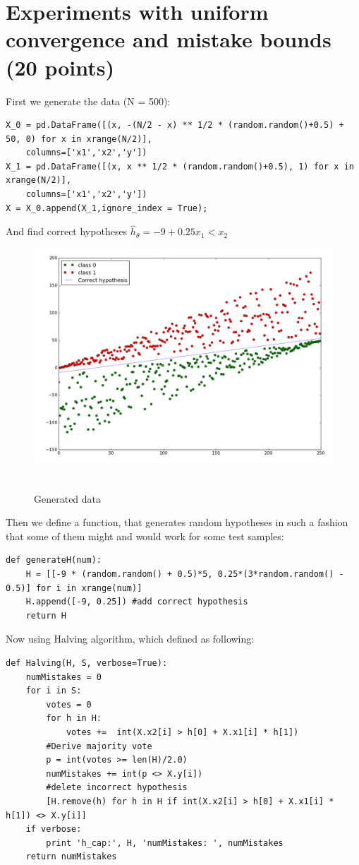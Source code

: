 \documentclass{article}
\newcommand{\hhat}{\hat{h}}
\begin{document}
\pagebreak
\section{Experiments with uniform convergence and mistake bounds (20 points)}	
First we generate the data (N = 500):
\begin{lstlisting}[frame=single]  
X_0 = pd.DataFrame([(x, -(N/2 - x) ** 1/2 * (random.random()+0.5) + 50, 0) for x in xrange(N/2)],
	columns=['x1','x2','y'])
X_1 = pd.DataFrame([(x, x ** 1/2 * (random.random()+0.5), 1) for x in xrange(N/2)],
	columns=['x1','x2','y'])
X = X_0.append(X_1,ignore_index = True);
\end{lstlisting}
And find correct hypotheses $\hhat_{\theta} = -9 + 0.25x_1 < x_2$
\begin{figure}[!htb]
	\centering
	\includegraphics[width=6in,clip,keepaspectratio]{data.png}\
	\caption{Generated data}	
\end{figure}

Then we define a function, that generates random hypotheses in such a fashion that some of them might and would work for some test samples:
\begin{lstlisting}[frame=single]  
def generateH(num):
	H = [[-9 * (random.random() + 0.5)*5, 0.25*(3*random.random() - 0.5)] for i in xrange(num)]
	H.append([-9, 0.25]) #add correct hypothesis
	return H
\end{lstlisting}

Now using Halving algorithm, which defined as following:
\begin{lstlisting}[frame=single]  
def Halving(H, S, verbose=True):
	numMistakes = 0
	for i in S:
		votes = 0
		for h in H:
			votes +=  int(X.x2[i] > h[0] + X.x1[i] * h[1])
		#Derive majority vote
		p = int(votes >= len(H)/2.0)
		numMistakes += int(p <> X.y[i])
		#delete incorrect hypothesis
		[H.remove(h) for h in H if int(X.x2[i] > h[0] + X.x1[i] * h[1]) <> X.y[i]]	
	if verbose:
		print 'h_cap:', H, 'numMistakes: ', numMistakes
	return numMistakes
\end{lstlisting}
	
\end{document}
